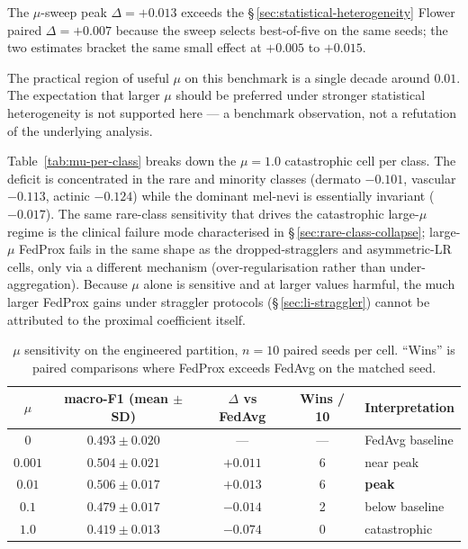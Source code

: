\documentclass[11pt,a4paper]{report}
\begin{document}
The $\mu$-sweep peak $\Delta = +0.013$ exceeds the
\S\,\ref{sec:statistical-heterogeneity} Flower paired $\Delta = +0.007$
because the sweep selects best-of-five on the same seeds; the two estimates
bracket the same small effect at $+0.005$ to $+0.015$.

The practical region of useful $\mu$ on this benchmark is a single decade
around $0.01$. The expectation that larger $\mu$ should be preferred under
stronger statistical heterogeneity is not supported here --- a benchmark
observation, not a refutation of the underlying analysis.

Table~\ref{tab:mu-per-class} breaks down the $\mu = 1.0$ catastrophic cell
per class. The deficit is concentrated in the rare and minority classes
(dermato $-0.101$, vascular $-0.113$, actinic $-0.124$) while the dominant
mel-nevi is essentially invariant ($-0.017$). The same rare-class
sensitivity that drives the catastrophic large-$\mu$ regime is the
clinical failure mode characterised in
\S\,\ref{sec:rare-class-collapse}; large-$\mu$ FedProx fails in the same
shape as the dropped-stragglers and asymmetric-LR cells, only via a
different mechanism (over-regularisation rather than under-aggregation).
Because $\mu$ alone is sensitive and at larger values harmful, the much
larger FedProx gains under straggler protocols
(\S\,\ref{sec:li-straggler}) cannot be attributed to the proximal
coefficient itself.



\begin{table}[h]
\centering
\caption{$\mu$ sensitivity on the engineered partition, $n=10$ paired
seeds per cell. ``Wins'' is paired comparisons where FedProx exceeds
FedAvg on the matched seed.}
\label{tab:mu-sweep}
\begin{tabular}{ccccl}
\hline
$\mu$    & macro-F1 (mean $\pm$ SD) & $\Delta$ vs FedAvg & Wins / 10 & Interpretation \\
\hline
$0$      & $0.493 \pm 0.020$        & ---               & ---       & FedAvg baseline                \\
$0.001$  & $0.504 \pm 0.021$        & $+0.011$          & 6         & near peak                      \\
$0.01$   & $\mathbf{0.506 \pm 0.017}$ & $\mathbf{+0.013}$ & 6       & \textbf{peak}                  \\
$0.1$    & $0.479 \pm 0.017$        & $-0.014$          & 2         & below baseline                 \\
$1.0$    & $0.419 \pm 0.013$        & $-0.074$          & 0         & catastrophic                   \\
\hline
\end{tabular}
\end{table}
\end{document}
